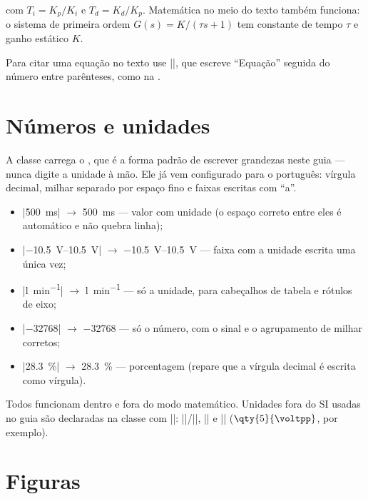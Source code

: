 com $T_i = K_p/K_i$ e $T_d = K_d/K_p$. Matemática no meio do texto também
funciona: o sistema de primeira ordem $G(s) = K/(\tau s + 1)$ tem constante de
tempo $\tau$ e ganho estático $K$.

Para citar uma equação no texto use \cd||, que escreve
\enquote{Equação} seguida do número entre parênteses, como na .

\section{Números e unidades}

A classe carrega o , que é a forma padrão de escrever grandezas
neste guia --- nunca digite a unidade à mão. Ele já vem configurado para o
português: vírgula decimal, milhar separado por espaço fino e faixas escritas
com \enquote{a}.

\begin{itemize}
  \item \cd|\qty{500}{\milli\second}| $\rightarrow$ \qty{500}{\milli\second}
        --- valor com unidade (o espaço correto entre eles é automático e
        não quebra linha);
  \item \cd|\qtyrange{-10,5}{+10,5}{\volt}| $\rightarrow$
        \qtyrange{-10,5}{+10,5}{\volt} --- faixa com a unidade escrita uma
        única vez;
  \item \cd|\unit{\litre\per\minute}| $\rightarrow$ \unit{\litre\per\minute}
        --- só a unidade, para cabeçalhos de tabela e rótulos de eixo;
  \item \cd|\num{-32768}| $\rightarrow$ \num{-32768} --- só o número, com o
        sinal e o agrupamento de milhar corretos;
  \item \cd|\qty{28,3}{\percent}| $\rightarrow$ \qty{28,3}{\percent} ---
        porcentagem (repare que a vírgula decimal é escrita como vírgula).
\end{itemize}

Todos funcionam dentro e fora do modo matemático. Unidades fora do SI usadas
no guia são declaradas na classe com \cd|\DeclareSIUnit|: \cd|\bit|/\cd|\bits|, \cd|\rpm|
e \cd|\voltpp| ($\qty{5}{\voltpp}$, por exemplo).

\section{Figuras}

